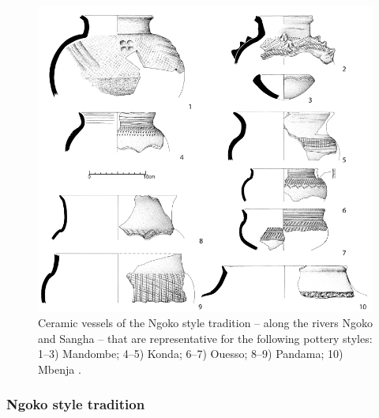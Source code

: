 \documentclass[smallextended,natbib]{svjour3}       %
\begin{document}
\begin{figure}[!tb]
	\centering
	\includegraphics[width=.6\textwidth]{fig/Ngoko-Trad_Typen.pdf}
	\caption{Ceramic vessels of the Ngoko style tradition -- along the rivers Ngoko and Sangha -- that are representative for the following pottery styles: 1--3) Mandombe; 4--5) Konda; 6--7) Ouesso; 8--9) Pandama; 10) Mbenja \citep[145--162]{Seidensticker.2021e}.}
	\label{fig:ngoko}
\end{figure}

\subsubsection*{Ngoko style tradition}
\end{document}
